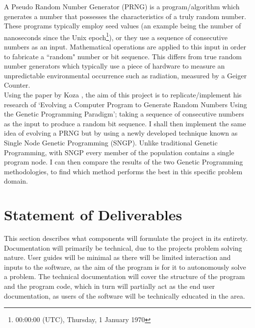 \documentclass[a4paper,10.5pt]{article}
\begin{document}
A Pseudo Random Number Generator (PRNG) is a program/algorithm which generates a number that possesses the characteristics of a truly random number. These programs typically employ seed values (an example being the number of nanoseconds since the Unix epoch\footnote{00:00:00 (UTC), Thursday, 1 January 1970}), or they use a sequence of consecutive numbers as an input. Mathematical operations are applied to this input in order to fabricate a ``random" number or bit sequence. This differs from true random number generators which typically use a piece of hardware to measure an unpredictable environmental occurrence such as radiation, measured by a Geiger Counter. \\

Using the paper by Koza \cite{kozarng}, the aim of this project is to replicate/implement his research of `Evolving a Computer Program to Generate Random Numbers Using the Genetic Programming Paradigm'; taking a sequence of consecutive numbers as the input to produce a random bit sequence. I shall then implement the same idea of evolving a PRNG but by using a newly developed technique known as Single Node Genetic Programming (SNGP). Unlike traditional Genetic Programming, with SNGP every member of the population contains a single program node\cite[p.1]{jacksonsngp}. I can then compare the results of the two Genetic Programming methodologies, to find which method performs the best in this specific problem domain.

\section{Statement of Deliverables}
This section describes what components will formulate the project in its entirety.
\\Documentation will primarily be technical, due to the projects problem solving nature. User guides will be minimal as there will be limited interaction and inputs to the software, as the aim of the program is for it to autonomously solve a problem. The technical documentation will cover the structure of the program and the program code, which in turn will partially act as the end user documentation, as users of the software will be technically educated in the area.\\
\end{document}
